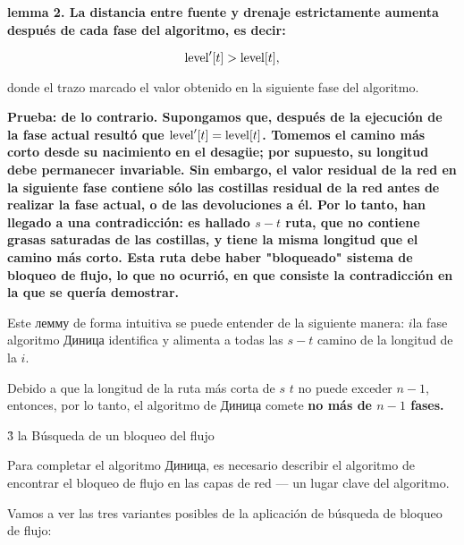 \bf{lemma 2}. La distancia entre fuente y drenaje estrictamente aumenta después de cada fase del algoritmo, es decir:

$$ {\rm level}^\prime[t] > {\rm level}[t], $$

donde el trazo marcado el valor obtenido en la siguiente fase del algoritmo.

\bf{Prueba}: de lo contrario. Supongamos que, después de la ejecución de la fase actual resultó que $ {\rm level}^\prime[t] = {\rm level}[t] $. Tomemos el camino más corto desde su nacimiento en el desagüe; por supuesto, su longitud debe permanecer invariable. Sin embargo, el valor residual de la red en la siguiente fase contiene sólo las costillas residual de la red antes de realizar la fase actual, o de las devoluciones a él. Por lo tanto, han llegado a una contradicción: es hallado $s-t$ ruta, que no contiene grasas saturadas de las costillas, y tiene la misma longitud que el camino más corto. Esta ruta debe haber "bloqueado" sistema de bloqueo de flujo, lo que no ocurrió, en que consiste la contradicción en la que se quería demostrar.

Este лемму de forma intuitiva se puede entender de la siguiente manera: $i$la fase algoritmo Диница identifica y alimenta a todas las $s-t$ camino de la longitud de la $i$.

Debido a que la longitud de la ruta más corta de $s$ $t$ no puede exceder $n-1$, entonces, por lo tanto, el algoritmo de Диница comete \bf{no más de $n-1$ fases}.


\h3{ la Búsqueda de un bloqueo del flujo }

Para completar el algoritmo Диница, es necesario describir el algoritmo de encontrar el bloqueo de flujo en las capas de red --- un lugar clave del algoritmo.

Vamos a ver las tres variantes posibles de la aplicación de búsqueda de bloqueo de flujo:

